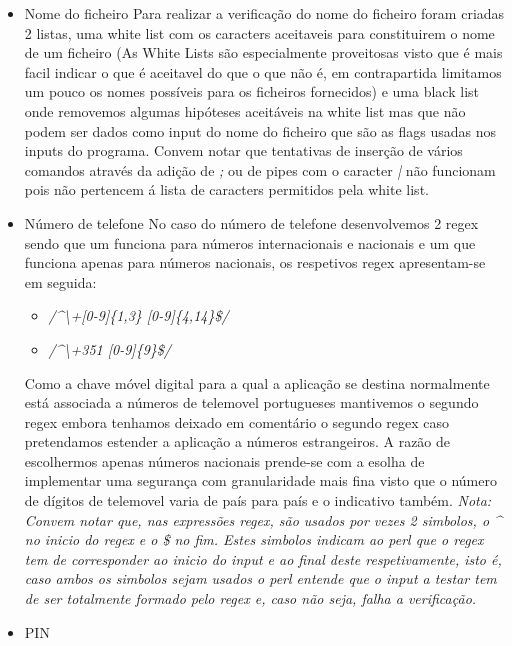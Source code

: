 \begin{itemize}
\item Nome do ficheiro\newline
 Para realizar a verificação do nome do ficheiro foram criadas 2 listas, uma white list com os caracters aceitaveis para constituirem o nome de um ficheiro (As White Lists são especialmente proveitosas visto que é mais facil indicar o que é aceitavel do que o que não é, em contrapartida limitamos um pouco os nomes possíveis para os ficheiros fornecidos) e uma black list onde removemos algumas hipóteses aceitáveis na white list mas que não podem ser dados como input do nome do ficheiro que são as flags usadas nos inputs do programa.\newline
 Convem notar que tentativas de inserção de vários comandos através da adição de \textit{;} ou de pipes com o caracter \textit{|} não funcionam pois não pertencem á lista de caracters permitidos pela white list.

\hfill\newline
\item Número de telefone\newline
 No caso do número de telefone desenvolvemos 2 regex sendo que um funciona para números internacionais e nacionais e um que funciona apenas para números nacionais, os respetivos regex apresentam-se em seguida:\newline
\begin{itemize}
	\item \textit{/\^{}\textbackslash+[0-9]\{1,3\} [0-9]\{4,14\}\$/}
	\item \textit{/\^{}\textbackslash+351 [0-9]\{9\}\$/}
\end{itemize}

\hfill\newline
\par Como a chave móvel digital para a qual a aplicação se destina normalmente está associada a números de telemovel portugueses mantivemos o segundo regex embora tenhamos deixado em comentário o segundo regex caso pretendamos estender a aplicação a números estrangeiros. A razão de escolhermos apenas números nacionais prende-se com a esolha de implementar uma segurança com granularidade mais fina visto que o número de dígitos de telemovel varia de país para país e o indicativo também.\newline
\textit{Nota: Convem notar que, nas expressões regex, são usados por vezes 2 simbolos, o \^{} no inicio do regex e o \$ no fim. Estes simbolos indicam ao perl que o regex tem de corresponder ao inicio do input e ao final deste respetivamente, isto é, caso ambos os simbolos sejam usados o perl entende que o input a testar tem de ser totalmente formado pelo regex e, caso não seja, falha a verificação.}\newline
\hfill\newline
\item PIN\newline


\end{itemize}
